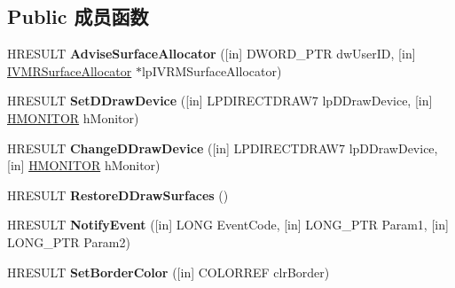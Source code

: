 \subsection*{Public 成员函数}
\begin{DoxyCompactItemize}
\item 
\mbox{\label{interface_i_v_m_r_surface_allocator_notify_ad0b78c3402933fb78692da35681c3d1c}} 
H\+R\+E\+S\+U\+LT {\bfseries Advise\+Surface\+Allocator} (\mbox{[}in\mbox{]} D\+W\+O\+R\+D\+\_\+\+P\+TR dw\+User\+ID, \mbox{[}in\mbox{]} \hyperlink{interface_i_v_m_r_surface_allocator}{I\+V\+M\+R\+Surface\+Allocator} $\ast$lp\+I\+V\+R\+M\+Surface\+Allocator)
\item 
\mbox{\label{interface_i_v_m_r_surface_allocator_notify_a5253c03c9f06513cb61f81dd89066502}} 
H\+R\+E\+S\+U\+LT {\bfseries Set\+D\+Draw\+Device} (\mbox{[}in\mbox{]} L\+P\+D\+I\+R\+E\+C\+T\+D\+R\+A\+W7 lp\+D\+Draw\+Device, \mbox{[}in\mbox{]} \hyperlink{interfacevoid}{H\+M\+O\+N\+I\+T\+OR} h\+Monitor)
\item 
\mbox{\label{interface_i_v_m_r_surface_allocator_notify_a1f901e06a922b1dc63e846a407cf9149}} 
H\+R\+E\+S\+U\+LT {\bfseries Change\+D\+Draw\+Device} (\mbox{[}in\mbox{]} L\+P\+D\+I\+R\+E\+C\+T\+D\+R\+A\+W7 lp\+D\+Draw\+Device, \mbox{[}in\mbox{]} \hyperlink{interfacevoid}{H\+M\+O\+N\+I\+T\+OR} h\+Monitor)
\item 
\mbox{\label{interface_i_v_m_r_surface_allocator_notify_a5efe60caa4ff4bc85523518a4289b97b}} 
H\+R\+E\+S\+U\+LT {\bfseries Restore\+D\+Draw\+Surfaces} ()
\item 
\mbox{\label{interface_i_v_m_r_surface_allocator_notify_a7b71d0fc80888f70e0d81ab941b92ce2}} 
H\+R\+E\+S\+U\+LT {\bfseries Notify\+Event} (\mbox{[}in\mbox{]} L\+O\+NG Event\+Code, \mbox{[}in\mbox{]} L\+O\+N\+G\+\_\+\+P\+TR Param1, \mbox{[}in\mbox{]} L\+O\+N\+G\+\_\+\+P\+TR Param2)
\item 
\mbox{\label{interface_i_v_m_r_surface_allocator_notify_a3605e18af4e0f9cfbe797c657324f9f5}} 
H\+R\+E\+S\+U\+LT {\bfseries Set\+Border\+Color} (\mbox{[}in\mbox{]} C\+O\+L\+O\+R\+R\+EF clr\+Border)

\end{DoxyCompactItemize}
